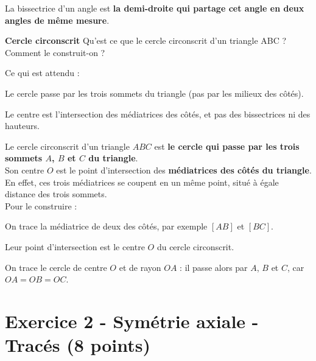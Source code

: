 \documentclass[answers]{exam}
\begin{document}
\begin{questions}
\begin{solution}
\begin{Indication}
      \end{Indication}   
      La bissectrice d’un angle est \textbf{la demi-droite qui partage cet angle en deux angles de même mesure}.
    \end{solution}

    \question[1] \textbf{Cercle circonscrit} Qu'est ce que le cercle circonscrit d'un triangle ABC ? Comment le construit-on ?
      \begin{solution}
        \begin{Indication}
Ce qui est attendu :
\begin{compactitem}
\item Le cercle passe par les trois sommets du triangle (pas par les milieux des côtés).
\item Le centre est l'intersection des médiatrices des côtés, et pas des bissectrices ni des hauteurs.
\end{compactitem}
        \end{Indication}

      Le cercle circonscrit d'un triangle $ABC$ est \textbf{le cercle qui passe par les trois sommets $A$, $B$ et $C$ du triangle}. \\

      Son centre $O$ est le point d'intersection des \textbf{médiatrices des côtés du triangle}. En effet, ces trois médiatrices se coupent en un même point, situé à égale distance des trois sommets. \\

      Pour le construire :
      \begin{compactenum}
        \item On trace la médiatrice de deux des côtés, par exemple $[AB]$ et $[BC]$.
        \item Leur point d'intersection est le centre $O$ du cercle circonscrit.
        \item On trace le cercle de centre $O$ et de rayon $OA$ : il passe alors par $A$, $B$ et $C$, car $OA = OB = OC$.
      \end{compactenum}
      \end{solution}
  \end{questions}

\pagebreak

\section*{Exercice 2 - Symétrie axiale - Tracés (8 points)}
\end{document}

